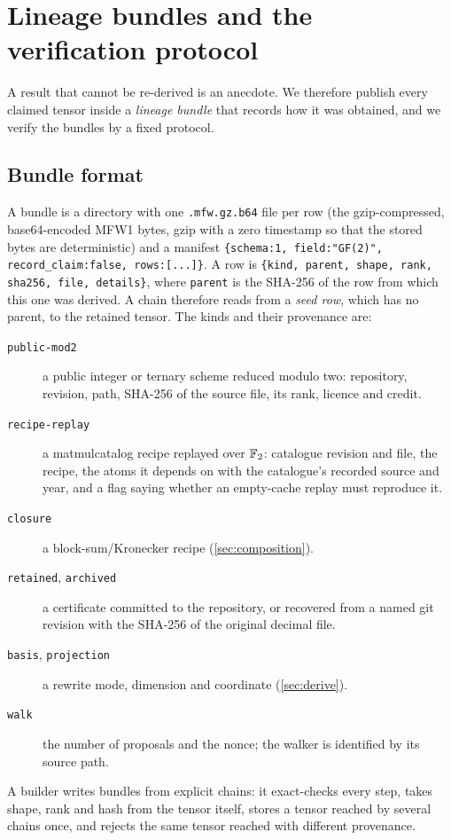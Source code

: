 \section{Lineage bundles and the verification protocol}\label{sec:lineage}

A result that cannot be re-derived is an anecdote. We therefore publish every claimed tensor inside a \emph{lineage bundle} that records how it was obtained, and we verify the bundles by a fixed protocol.

\subsection{Bundle format}
A bundle is a directory with one \texttt{.mfw.gz.b64} file per row (the gzip-compressed, base64-encoded MFW1 bytes, gzip with a zero timestamp so that the stored bytes are deterministic) and a manifest
\texttt{\{schema:1, field:"GF(2)", record\_claim:false, rows:[...]\}}.
A row is \texttt{\{kind, parent, shape, rank, sha256, file, details\}}, where \texttt{parent} is the SHA-256 of the row from which this one was derived. A chain therefore reads from a \emph{seed row}, which has no parent, to the retained tensor.
The kinds and their provenance are:
\begin{description}
\item[\texttt{public-mod2}] a public integer or ternary scheme reduced modulo two: repository, revision, path, SHA-256 of the source file, its rank, licence and credit.
\item[\texttt{recipe-replay}] a matmulcatalog recipe replayed over ${\mathbb{F}_2}$: catalogue revision and file, the recipe, the atoms it depends on with the catalogue's recorded source and year, and a flag saying whether an empty-cache replay must reproduce it.
\item[\texttt{closure}] a block-sum/Kronecker recipe (\cref{sec:composition}).
\item[\texttt{retained}, \texttt{archived}] a certificate committed to the repository, or recovered from a named git revision with the SHA-256 of the original decimal file.
\item[\texttt{basis}, \texttt{projection}] a rewrite mode, dimension and coordinate (\cref{sec:derive}).
\item[\texttt{walk}] the number of proposals and the nonce; the walker is identified by its source path.
\end{description}
A builder writes bundles from explicit chains: it exact-checks every step, takes shape, rank and hash from the tensor itself, stores a tensor reached by several chains once, and rejects the same tensor reached with different provenance.

